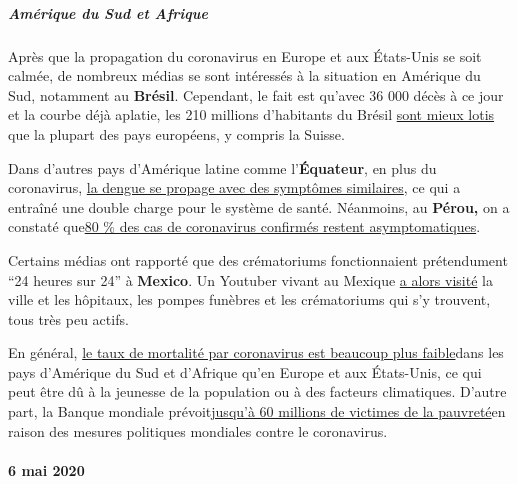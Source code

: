 \hypertarget{amuxe9rique-du-sud-et-afrique}{%
\subparagraph{\texorpdfstring{\textbf{Amérique du Sud et
Afrique}}{Amérique du Sud et Afrique}}\label{amuxe9rique-du-sud-et-afrique}}

Après que la propagation du coronavirus en Europe et aux États-Unis se
soit calmée, de nombreux médias se sont intéressés à la situation en
Amérique du Sud, notamment au \textbf{Brésil}. Cependant, le fait est
qu'avec 36 000 décès à ce jour et la courbe déjà aplatie, les 210
millions d'habitants du Brésil
\href{https://www.statista.com/statistics/1104709/coronavirus-deaths-worldwide-per-million-inhabitants/}{sont
mieux lotis} que la plupart des pays européens, y compris la Suisse.

Dans d'autres pays d'Amérique latine comme l'\textbf{Équateur}, en plus
du coronavirus,
\href{https://www.bbc.com/mundo/noticias-america-latina-52383340}{la
dengue se propage avec des symptômes similaires}, ce qui a entraîné une
double charge pour le système de santé. Néanmoins, au \textbf{Pérou,} on
a constaté
que\href{https://exitosanoticias.pe/v1/covid-19-minsa-el-80-de-casos-confirmados-en-el-peru-son-asintomaticos/}{80
\% des cas de coronavirus confirmés restent asymptomatiques}.

Certains médias ont rapporté que des crématoriums fonctionnaient
prétendument ``24 heures sur 24'' à \textbf{Mexico}. Un Youtuber vivant
au Mexique \href{https://www.youtube.com/watch?v=_vQhwEZpDPE}{a alors
visité} la ville et les hôpitaux, les pompes funèbres et les
crématoriums qui s'y trouvent, tous très peu actifs.

En général,
\href{https://www.msn.com/en-gb/news/world/coronavirus-why-africa-seems-to-have-few-cases/ar-BB10MNJd}{le
taux de mortalité par coronavirus est beaucoup plus faible}dans les pays
d'Amérique du Sud et d'Afrique qu'en Europe et aux États-Unis, ce qui
peut être dû à la jeunesse de la population ou à des facteurs
climatiques. D'autre part, la Banque mondiale
prévoit\href{https://www.deccanherald.com/business/economy-business/world-bank-says-covid-19-to-push-60-million-into-poverty-announces-usd-160-billion-assistance-to-100-countries-839661.html}{jusqu'à
60 millions de victimes de la pauvreté}en raison des mesures politiques
mondiales contre le coronavirus.

\hypertarget{6-mai-2020}{%
\paragraph{6 mai 2020}\label{6-mai-2020}}


